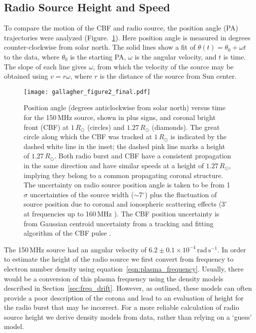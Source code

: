 

\subsection{Radio Source Height and Speed}
To compare the motion of the CBF and radio source, the position angle (PA) trajectories were analyzed (Figure.~\ref{fig:angle_time}). Here position angle is measured in degrees counter-clockwise from solar north. The solid lines show a fit of $\theta(t) = \theta_0 + \omega t$ to the data, where $\theta_0$ is the starting PA, $\omega$ is the angular velocity, and $t$ is time. The slope of each line gives $\omega$, from which the velocity of the source may be obtained using $v=r\omega$, where $r$ is the distance of the source from Sun center. 
\begin{figure}[!t]
\begin{center}
\texttt{[image: gallagher\_figure2\_final.pdf]}
\caption{Position angle (degrees anticlockwise from solar north) versus time for the 150\,MHz source, shown in plus signs, and coronal bright front (CBF) at $1\,R_{\odot}$ (circles) and $1.27\,R_{\odot}$ (diamonds). The great circle along which the CBF was tracked at $1\,R_{\odot}$ is indicated by the dashed white line in the inset; the dashed pink line marks a height of $1.27\,R_{\odot}$. Both radio burst and CBF have a consistent propagation in the same direction and have similar speeds at a height of $1.27\,R_{\odot}$, implying they belong to a common propagating coronal structure. The uncertainty on radio source position angle is taken to be from 1$\sigma$ uncertainties of the source width ($\sim$7$^{\circ}$) plus the fluctuation of source position due to coronal and ionospheric scattering effects ($3^{\circ}$ at frequencies up to 160\,MHz \citep{stewart1982}). The CBF position uncertainty is from Gaussian centroid uncertainty from a tracking and fitting algorithm of the CBF pulse \citep{long2011a}.}
\label{fig:angle_time}
\end{center}
\end{figure}

The 150\,MHz source had an angular velocity of $6.2\pm0.1\times10^{-4}\,\mathrm{rad\,s^{-1}} $. In order to estimate the height of the radio source we first convert from frequency to electron number density using equation~\ref{eqn:plasma_frequency}. Usually, there would be a conversion of this plasma frequency using the density models described in Section~\ref{sec:freq_drift}. However, as outlined, these models can often provide a poor description of the corona and lead to an evaluation of height for the radio burst that may be incorrect. For a more reliable calculation of radio source height we derive density models from data, rather than relying on a `guess' model.


